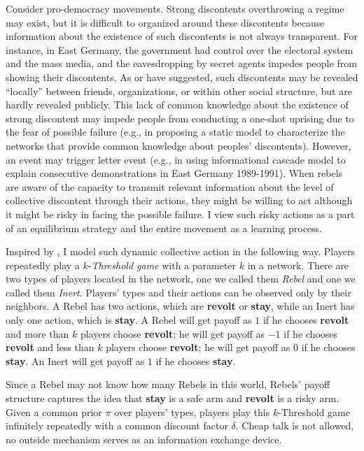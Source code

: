 \documentclass[12pt,letter]{article}
\theoremstyle{definition}
\theoremstyle{remark}
\theoremstyle{claim}
\begin{document}
Consider pro-democracy movements. Strong discontents overthrowing a regime may exist, but it is difficult to organized around these discontents because information about the existence of such discontents is not always transparent. For instance, in East Germany, the government had control over the electoral system and the mass media, and the eavesdropping by secret agents impedes people from showing their discontents. As \citep{Karl-Dieter1993} or \citep{Chwe2000} have suggested, such discontents may be revealed ``locally'' between friends, organizations, or within other social structure, but are hardly revealed publicly. This lack of common knowledge about the existence of strong discontent may impede people from conducting a one-shot uprising due to the fear of possible failure (e.g., \citep{Chwe2000} in proposing a static model to characterize the networks that provide common knowledge about peoples' discontents). However, an event may trigger letter event (e.g., \citep{Lohmann2011} in using informational cascade model to explain consecutive demonstrations in East Germany 1989-1991). When rebels are aware of the capacity to transmit relevant information about the level of collective discontent through their actions, they might be willing to act although it might be risky in facing the possible failure. I view such risky actions as a part of an equilibrium strategy and the entire movement as a learning process. 




Inspired by \citep{Chwe2000}, I model such dynamic collective action in the following way. Players repeatedly play a $k$-\textit{Threshold game} with a parameter $k$ in a network. There are two types of players located in the network, one we called them \textit{Rebel} and one we called them \textit{Inert}.  Players' types and their actions can be observed only by their neighbors. A Rebel has two actions, which are \textbf{revolt} or \textbf{stay}, while an Inert has only one action, which is \textbf{stay}. A Rebel will get payoff as $1$ if he chooses \textbf{revolt} and more than $k$ players choose \textbf{revolt}; he will get payoff as $-1$ if he chooses \textbf{revolt} and less than $k$ players choose \textbf{revolt}; he will get payoff as $0$ if he chooses \textbf{stay}. An Inert will get payoff as $1$ if he chooses \textbf{stay}.

Since a Rebel may not know how many Rebels in this world, Rebels' payoff structure captures the idea that \textbf{stay} is a safe arm and \textbf{revolt} is a risky arm. Given a common prior $\pi$ over players' types, players play this $k$-Threshold game infinitely repeatedly with a common discount factor $\delta$. Cheap talk is not allowed, no outside mechanism serves as an information exchange device. 
\end{document}
